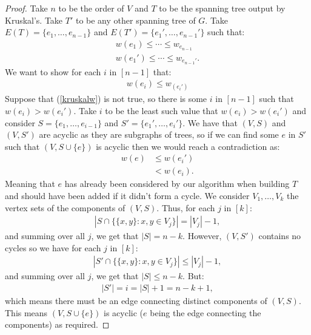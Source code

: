 \begin{proof}
    Take $n$ to be the order of $V$ and $T$ to be the spanning tree
    output by Kruskal's. Take $T'$ to be any other spanning tree of $G$.
    Take $E(T) = \{e_1, \ldots, e_{n - 1}\}$ and $E(T') = \{e_1', \ldots, e_{n - 1}'\}$
    such that: \begin{gather*}
        w(e_1) \leq \cdots \leq w_{e_{n - 1}} \\
        w(e_1') \leq \cdots \leq w_{e_{n - 1}'}.
    \end{gather*} We want to show for each $i$ in $[n - 1]$ that: 
    \begin{gather} \label{kruskalw}
        w(e_i) \leq w_(e_i')
    \end{gather}
    Suppose that (\ref{kruskalw}) is not true, so there is some $i$ in $[n - 1]$ such
    that $w(e_i) > w(e_i')$. Take $i$ to be the least such value that $w(e_i) > w(e_i')$
    and consider $S = \{e_1, \ldots, e_{i - 1}\}$ and $S' = \{e_1', \ldots, e_i'\}$.
    We have that $(V, S)$ and $(V, S')$ are acyclic as they are subgraphs of trees,
    so if we can find some $e$ in $S'$ such that $(V, S \cup \{e\})$ is acyclic
    then we would reach a contradiction as: \begin{align*}
        w(e) &\leq w(e_i') \tag{as $e$ is already in $S'$} \\
        &< w(e_i).
    \end{align*} Meaning that $e$ has already been considered by our algorithm
    when building $T$ and should have been added if it didn't form a cycle.
    \newpage
    We consider $V_1, \ldots, V_k$ the vertex sets of the components of $(V, S)$.
    Thus, for each $j$ in $[k]$: \begin{gather*}
        |S \cap \{\{x, y\} : x, y \in V_j\}| = |V_j| - 1,
    \end{gather*} and summing over all $j$, we get that $|S| = n - k$.
    However, $(V, S')$ contains no cycles so we have for each $j$ in $[k]$: 
    \begin{gather*}
        |S' \cap \{\{x, y\} : x, y \in V_j\}| \leq |V_j| - 1,
    \end{gather*} and summing over all $j$, we get that $|S| \leq n - k$.
    But: \begin{gather*}
        |S'| = i = |S| + 1 = n - k + 1,
    \end{gather*} which means there must be an edge
    connecting distinct components of $(V, S)$. This means $(V, S \cup \{e\})$
    is acyclic ($e$ being the edge connecting the components) as required.
\end{proof}